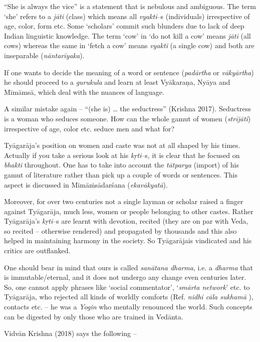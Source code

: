“She is always the vice” is a statement that is nebulous and ambiguous. The term ‘she’ refers to a \textit{jāti} (class) which means all \textit{vyakti}–s (individuals) irrespective of age, color, form etc. Some ‘scholars’ commit such blunders due to lack of deep Indian linguistic knowledge. The term ‘cow’ in ‘do not kill a cow’ means \textit{jāti} (all cows) whereas the same in ‘fetch a cow’ means \textit{vyakti} (a single cow) and both are inseparable (\textit{nāntarīyaka}). 

If one wants to decide the meaning of a word or sentence (\textit{padārtha} or \textit{vākyārtha}) he should proceed to a \textit{gurukula} and learn at least Vyākaraṇa, Nyāya and Mīmāmsā, which deal with the nuances of language. 

A similar mistake again – “(she is) … the seductress” (Krishna 2017). Seductress is a woman who seduces someone. How can the whole gamut of women (\textit{strījāti}) irrespective of age, color etc. seduce men and what for? 

Tyāgarāja’s position on women and caste was not at all shaped by his times. Actually if you take a serious look at his \textit{kṛti}–s, it is clear that he focused on \textit{bhakti} throughout. One has to take into account the \textit{tātparya} (import) of his gamut of literature rather than pick up a couple of words or sentences. This aspect is discussed in Mīmāṁsādarśana (\textit{ekavākyatā}). 

Moreover, for over two centuries not a single layman or scholar raised a finger against Tyāgarāja, much less, women or people belonging to other castes. Rather Tyāgarāja’s \textit{kṛti}–s are learnt with devotion, recited (they are on par with Veda, so recited – otherwise rendered) and propagated by thousands and this also helped in maintaining harmony in the society. So Tyāgarājais vindicated and his critics are outflanked. 

One should bear in mind that ours is called \textit{sanātana dharma}, i.e. a \textit{dharma} that is immutable/eternal, and it does not undergo any change even centuries later. So, one cannot apply phrases like ‘social commentator’, ‘\textit{smārta network}’ etc. to Tyāgarāja, who rejected all kinds of worldly comforts (Ref. \textit{nidhi cāla sukhamā} ), contacts etc. – he was a \textit{Yogin} who mentally renounced the world. Such concepts can be digested by only those who are trained in Vedānta.

Vidvān Krishna (2018) says the following –

